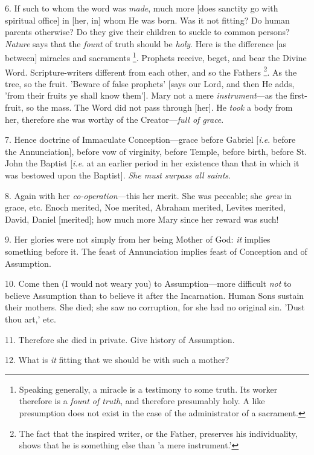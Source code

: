 6. If such to whom the word was \emph{made}, much
more [does sanctity go with spiritual office] in [her, in] whom He was
born. Was it not fitting? Do human parents otherwise? Do they give
their children to suckle to common persons? \emph{Nature} says that
the \emph{fount} of truth should be \emph{holy}. Here is the
difference [as between] miracles and sacraments \footnote{Speaking generally, a
miracle is a testimony to some truth. Its worker therefore is a \emph{fount
of truth}, and therefore presumably holy. A like presumption does
not exist in the case of the administrator of a sacrament.}. Prophets receive, beget, and bear the Divine Word.
Scripture-writers different from each other, and so the Fathers \footnote{The fact that the
inspired writer, or the Father, preserves his individuality, shows
that he is something else than 'a mere instrument.'}. As the tree, so the fruit. 'Beware of false prophets' [says
our Lord, and then He adds, 'from their fruits ye shall know them'].
Mary not a mere \emph{instrument}—as the first-fruit, so the mass.
The Word did not pass through [her]. He \emph{took} a body from her,
therefore she was worthy of the Creator—\emph{full of grace}.

7. Hence doctrine of Immaculate
Conception—grace before Gabriel [\emph{i.e}. before the
Annunciation], before vow of virginity, before Temple, before birth,
before St. John the Baptist [\emph{i.e}. at an earlier period in her
existence than that in which it was bestowed upon the Baptist]. \emph{She
must surpass all saints}.

8. Again with her \emph{co-operation}—this her
merit. She was peccable; she \emph{grew} in grace, etc. Enoch merited,
Noe merited, Abraham merited, Levites merited, David, Daniel
[merited]; how much more Mary since her reward was such!

9. Her glories were not simply from her being
Mother of God: \emph{it} implies something before it. The feast of
Annunciation implies feast of Conception and of Assumption.

10. Come then (I would not weary you) to
Assumption—more difficult \emph{not} to believe Assumption than to
believe it after the Incarnation. Human Sons sustain their mothers.
She died; she saw no corruption, for she had no original sin. 'Dust
thou art,' etc.

11. Therefore she died in private. Give history
of Assumption.

12. What is \emph{it} fitting that we should be
with such a mother?

